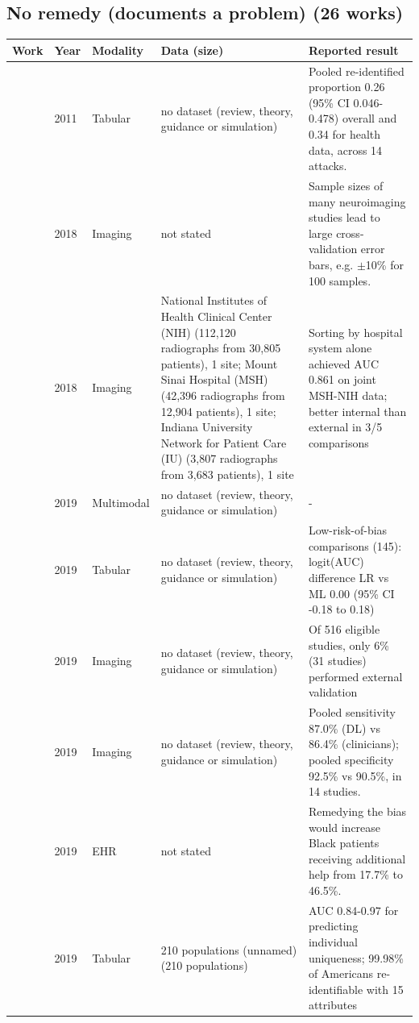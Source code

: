 \subsection*{No remedy (documents a problem) (26 works)}
\begin{longtable}{@{}p{2.6cm}p{0.7cm}p{1.2cm}p{4.4cm}p{4.6cm}@{}}
\toprule
Work & Year & Modality & Data (size) & Reported result\\
\midrule
\endhead
\cite{elemam2011systematic} & 2011 & Tabular & no dataset (review, theory, guidance or simulation) & Pooled re-identified proportion 0.26 (95\% CI 0.046-0.478) overall and 0.34 for health data, across 14 attacks.\\
\cite{varoquaux2018cross} & 2018 & Imaging & not stated & Sample sizes of many neuroimaging studies lead to large cross-validation error bars, e.g. $\pm$10\% for 100 samples.\\
\cite{zech2018variable} & 2018 & Imaging & National Institutes of Health Clinical Center (NIH) (112,120 radiographs from 30,805 patients), 1 site; Mount Sinai Hospital (MSH) (42,396 radiographs from 12,904 patients), 1 site; Indiana University Network for Patient Care (IU) (3,807 radiographs from 3,683 patients), 1 site & Sorting by hospital system alone achieved AUC 0.861 on joint MSH-NIH data; better internal than external in 3/5 comparisons\\
\cite{brasil2019artificial} & 2019 & Multimodal & no dataset (review, theory, guidance or simulation) & -\\
\cite{christodoulou2019systematic} & 2019 & Tabular & no dataset (review, theory, guidance or simulation) & Low-risk-of-bias comparisons (145): logit(AUC) difference LR vs ML 0.00 (95\% CI -0.18 to 0.18)\\
\cite{kim2019design} & 2019 & Imaging & no dataset (review, theory, guidance or simulation) & Of 516 eligible studies, only 6\% (31 studies) performed external validation\\
\cite{liu2019comparison} & 2019 & Imaging & no dataset (review, theory, guidance or simulation) & Pooled sensitivity 87.0\% (DL) vs 86.4\% (clinicians); pooled specificity 92.5\% vs 90.5\%, in 14 studies.\\
\cite{obermeyer2019dissecting} & 2019 & EHR & not stated & Remedying the bias would increase Black patients receiving additional help from 17.7\% to 46.5\%.\\
\cite{rocher2019estimating} & 2019 & Tabular & 210 populations (unnamed) (210 populations) & AUC 0.84-0.97 for predicting individual uniqueness; 99.98\% of Americans re-identifiable with 15 attributes\\

\end{longtable}
